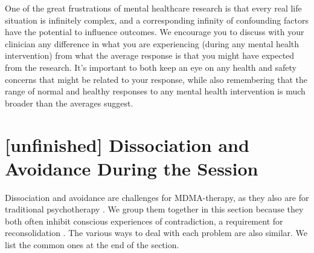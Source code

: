 \documentclass[12pt,letterpaper]{book}
\begin{document}
One of the great frustrations of mental healthcare research is that every real life situation is infinitely complex, and a corresponding infinity of confounding factors have the potential to influence outcomes. We encourage you to discuss with your clinician any difference in what you are experiencing (during any mental health intervention) from what the average response is that you might have expected from the research. It's important to both keep an eye on any health and safety concerns that might be related to your response, while also remembering that the range of normal and healthy responses to any mental health intervention is much broader than the averages suggest.
\section{[unfinished] Dissociation and Avoidance During the Session}
\label{sec:dissociationandresistance}
Dissociation and avoidance are challenges for MDMA-therapy, as they also are for traditional psychotherapy \cite{razviPSIP}. We group them together in this section because they both often inhibit conscious experiences of contradiction, a requirement for reconsolidation \cite{eckerUnlocking,kozlowskaDefenseCascade}. The various ways to deal with each problem are also similar. We list the common ones at the end of the section.
\end{document}

